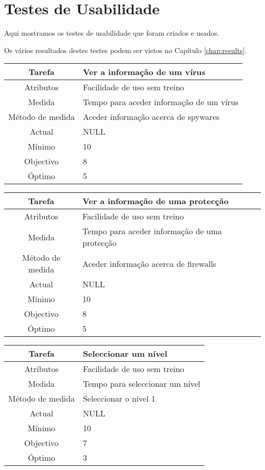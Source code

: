 \chapter{Testes de Usabilidade}
\label{chap:tests} 
Aqui mostramos os testes de usabilidade que foram criados e usados.

Os vários resultados destes testes podem ser vistos no Capítulo \ref{chap:results}.

\begin{center}
	\begin{tabular} {|c|p{10cm}|}
		\hline
		Tarefa & Ver a informação de um vírus \\
		\hline
		Atributos & Facilidade de uso sem treino \\
		\hline
		Medida & Tempo para aceder informação de um vírus \\
		\hline
		Método de medida & Aceder informação acerca de spywares \\
		\hline
		Actual & NULL \\
		Mínimo & 10 \\
		Objectivo & 8 \\
		Óptimo & 5 \\
		\hline
	\end{tabular}
\end{center}

\begin{center}
	\begin{tabular} {|c|p{10cm}|}
		\hline
		Tarefa & Ver a informação de uma protecção \\
		\hline
		Atributos & Facilidade de uso sem treino \\
		\hline
		Medida & Tempo para aceder informação de uma protecção \\
		\hline
		Método de medida & Aceder informação acerca de firewalls \\
		\hline
		Actual & NULL \\
		Mínimo & 10 \\
		Objectivo & 8 \\
		Óptimo & 5 \\
		\hline
	\end{tabular}
\end{center}

\begin{center}
	\begin{tabular} {|c|p{10cm}|}
		\hline
		Tarefa & Seleccionar um nível \\
		\hline
		Atributos & Facilidade de uso sem treino \\
		\hline
		Medida & Tempo para seleccionar um nível \\
		\hline
		Método de medida & Seleccionar o nível 1 \\
		\hline
		Actual & NULL \\
		Mínimo & 10 \\
		Objectivo & 7 \\
		Óptimo & 3 \\
		\hline
	\end{tabular}
\end{center}

